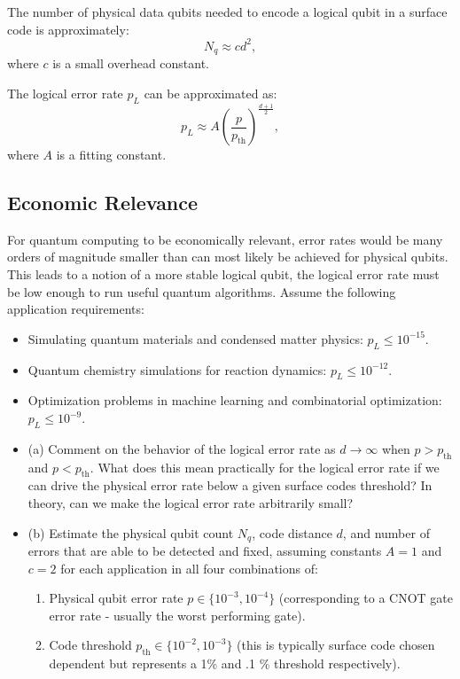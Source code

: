 \documentclass[12pt]{article}
\begin{document}
The number of physical data qubits needed to encode a logical qubit in a surface code is approximately:
\begin{equation}
    N_q \approx c d^2,
\end{equation}
where $c$ is a small overhead constant.

The logical error rate $p_L$ can be approximated as:
\begin{equation}
    p_L \approx A \left( \frac{p}{p_{\text{th}}} \right)^{\frac{d+1}{2}},
\end{equation}
where $A$ is a fitting constant.

\subsection*{Economic Relevance}
For quantum computing to be economically relevant, error rates would be many orders of magnitude smaller than can most likely be achieved for physical qubits. This leads to a notion of a more stable logical qubit, the logical error rate must be low enough to run useful quantum algorithms. Assume the following application requirements:

\begin{itemize}
    \item Simulating quantum materials and condensed matter physics: $p_L \leq 10^{-15}$.
    \item Quantum chemistry simulations for reaction dynamics: $p_L \leq 10^{-12}$.
    \item Optimization problems in machine learning and combinatorial optimization: $p_L \leq 10^{-9}$.
\end{itemize}

\begin{itemize}
    \item (a) Comment on the behavior of the logical error rate as $d \rightarrow \infty$ when $p > p_{\text{th}} $ and $p < p_{\text{th}}$. What does this mean practically for the logical error rate if we can drive the physical error rate below a given surface codes threshold? In theory, can we make the logical error rate arbitrarily small?
    \item (b) Estimate the physical qubit count $N_q$, code distance $d$, and number of errors that are able to be detected and fixed, assuming constants $A=1$ and $c=2$ for each application in all four combinations of:
\begin{enumerate}
    \item Physical qubit error rate $p \in \{10^{-3}, 10^{-4}\}$ (corresponding to a CNOT gate error rate - usually the worst performing gate).
    \item Code threshold $p_{\text{th}} \in \{10^{-2}, 10^{-3}\}$ (this is typically surface code chosen dependent but represents a 1\% and .1 \% threshold respectively).
    
\end{enumerate}
    
\end{itemize}
\end{document}
